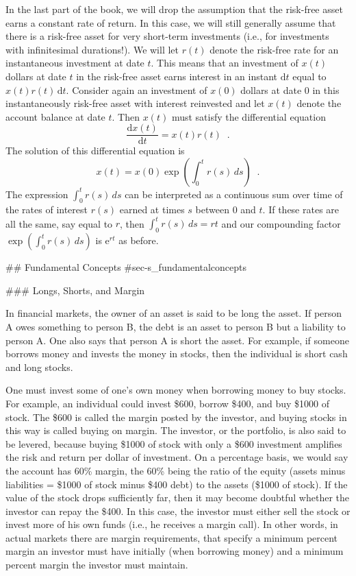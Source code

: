 In the last part of the book, we will drop the assumption that the risk-free asset earns a constant rate of return.  In this case, we will still generally assume that there is a risk-free asset for very short-term investments (i.e., for investments with infinitesimal durations!).  We will let $r(t)$ denote the risk-free rate for an instantaneous investment at date $t$. This means that an investment of $x(t)$ dollars at date $t$ in the risk-free asset earns interest in an instant $\mathrm{d} t$ equal to $x(t)r(t)\,\mathrm{d} t$.  Consider again an investment of $x(0)$ dollars at date 0 in this instantaneously risk-free asset with interest reinvested and let $x(t)$ denote the account balance at date $t$.  Then $x(t)$ must satisfy the differential equation
$$\frac{\mathrm{d} x(t)}{\mathrm{d} t} = x(t)r(t)\;\;.$$
The solution of this differential equation is
$$x(t) = x(0)\exp\left(\int_0^t r(s)\,ds\right)\;\;.$$
The expression $\int_0^t r(s)\,ds$ can be interpreted as a continuous sum over time of the rates of interest $r(s)$ earned at times $s$ between 0 and $t$.  If these rates are all the same, say equal to $r$, then $\int_0^t r(s)\,ds = rt$ and our compounding factor $\exp\left(\int_0^t r(s)\,ds\right)$ is $\mathrm{e}^{rt}$ as before.  


## Fundamental Concepts {#sec-s_fundamentalconcepts}

### Longs, Shorts, and Margin

In financial markets, the owner of an asset is said to be long the asset.   If person A owes something to person B, the debt is an asset to person B but a liability to person A.  One also says that person A is short the asset.   For example, if someone borrows money and invests the money in stocks, then the individual is short cash and long stocks.  

One must invest some of one's own money when borrowing money to buy stocks.  For example, an individual could invest \$600, borrow \$400, and buy \$1000 of stock.  The \$600 is called the margin  posted by the investor, and buying stocks in this way is called buying on margin.  The investor, or the portfolio, is also said to be levered, because buying \$1000 of stock with only a \$600 investment amplifies the risk and return per dollar of investment.   On a percentage basis, we would say the account has 60\% margin, the 60\% being the ratio of the equity (assets minus liabilities = \$1000 of stock minus \$400 debt) to the assets (\$1000 of stock).   If the value of the stock drops sufficiently far, then it may become doubtful whether the investor can repay the \$400.  In this case, the investor must either sell the stock or invest more of his own funds (i.e., he receives a margin call).   In other words, in actual markets there are margin requirements,  that specify a minimum percent margin an investor must have initially (when borrowing money) and a minimum percent margin the investor must maintain.  

